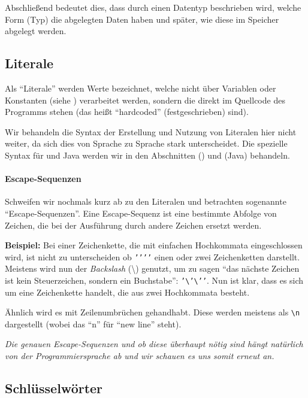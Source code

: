	Abschließend bedeutet dies, dass durch einen Datentyp beschrieben wird, welche Form (Typ) die abgelegten Daten haben und später, wie diese im Speicher abgelegt werden.

\subsection{Literale} \functionalMark \imperativeMark \oopMark
	
	Als \enquote{Literale} werden Werte bezeichnet, welche nicht über Variablen oder Konstanten (siehe ) verarbeitet werden, sondern die direkt im Quellcode des Programms stehen (das heißt \enquote{hardcoded} (festgeschrieben) sind).
	
	Wir behandeln die Syntax der Erstellung und Nutzung von Literalen hier nicht weiter, da sich dies von Sprache zu Sprache stark unterscheidet. Die spezielle Syntax für \racket und Java werden wir in den Abschnitten  (\racket) und  (Java) behandeln.
	
	\paragraph{Escape-Sequenzen}
		Schweifen wir nochmals kurz ab zu den Literalen und betrachten sogenannte \enquote{Escape-Sequenzen}. Eine Escape-Sequenz ist eine bestimmte Abfolge von Zeichen, die bei der Ausführung durch andere Zeichen ersetzt werden.
		
		\textbf{Beispiel:} Bei einer Zeichenkette, die mit einfachen Hochkommata eingeschlossen wird, ist nicht zu unterscheiden ob \texttt{'{}'{}'{}'} einen oder zwei Zeichenketten darstellt. Meistens wird nun der \textit{Backslash} (\textbackslash) genutzt,
		um zu sagen \enquote{das nächste Zeichen ist kein Steuerzeichen, sondern ein Buchstabe}: \texttt{'\textbackslash'\textbackslash'{}'}. Nun ist klar, dass es sich um eine Zeichenkette handelt, die aus zwei Hochkommata besteht.
		
		Ähnlich wird es mit Zeilenumbrüchen gehandhabt. Diese werden meistens als \texttt{\textbackslash n} dargestellt (wobei das \enquote{n} für \enquote{new line} steht).
		
		\textit{Die genauen Escape-Sequenzen und ob diese überhaupt nötig sind hängt natürlich von der Programmiersprache ab und wir schauen es uns somit erneut an.}

\subsection{Schlüsselwörter} \functionalMark \imperativeMark \oopMark
	
